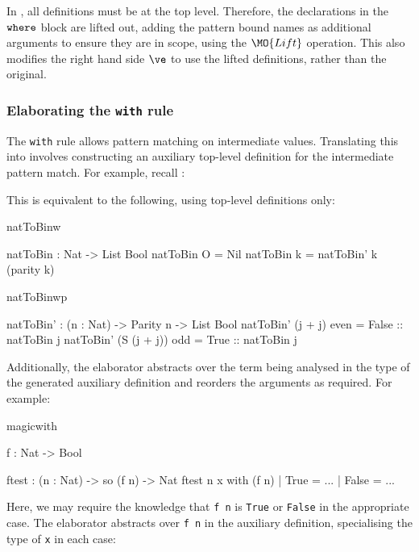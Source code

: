 In \TT{}, all definitions must be at the top level. Therefore, the declarations 
in the $\mathtt{where}$ block are lifted out, adding the pattern bound names as additional arguments
to ensure they are in scope, using the $\MO{Lift}$ operation. This also modifies
the right hand side $\ve$ to use the lifted definitions, rather than the original.

\subsubsection{Elaborating the \texttt{with} rule}

The \texttt{with} rule allows  pattern matching on intermediate values.
Translating this into \TT{} involves constructing an auxiliary top-level
definition for 
the intermediate pattern match. For example, recall :


\noindent
This is equivalent to the following, using top-level definitions only:

\begin{SaveVerbatim}{natToBinw}

natToBin : Nat -> List Bool
natToBin O = Nil
natToBin k = natToBin' k (parity k)

\end{SaveVerbatim}
\begin{SaveVerbatim}{natToBinwp}

natToBin' : (n : Nat) -> Parity n -> List Bool
natToBin' (j + j)     even = False :: natToBin j
natToBin' (S (j + j)) odd  = True  :: natToBin j

\end{SaveVerbatim}


\noindent
Additionally, the elaborator abstracts over the term being analysed in the type
of the generated auxiliary definition
and reorders the arguments as required.
For example:

\begin{SaveVerbatim}{magicwith}

f : Nat -> Bool

ftest : (n : Nat) -> so (f n) -> Nat
ftest n x with (f n)
     | True  = ...
     | False = ...

\end{SaveVerbatim}

\noindent
Here, we may require the knowledge that \texttt{f n} is \texttt{True} or
\texttt{False} in the appropriate case. The elaborator abstracts over
\texttt{f n} in the auxiliary definition, specialising the type of
\texttt{x} in each case:

